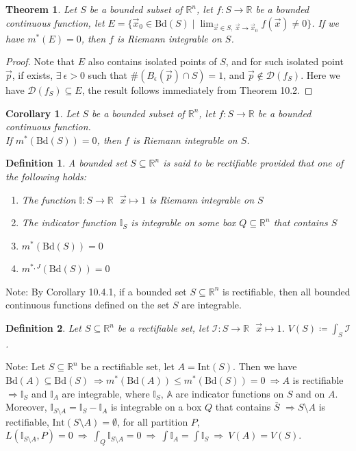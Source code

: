 \documentclass[15pt]{book}
\theoremstyle{break}
\theoremstyle{break}
\newtheorem{thm}{Theorem}[section]
\newtheorem{corT}[lem]{Corollary}
\newtheorem{defn}{Definition}[corL]
\newcommand{\R}{\mathbb{R}}
\newcommand{\D}{\mathcal{D}}
\newcommand{\Int}{\text{Int}}
\newcommand{\Bd}{\text{Bd}}
\newcommand{\note}{\color{red}Note: \color{black}}
\begin{document}
\begin{thm}
Let $S$ be a bounded subset of $\R^n$, let $f:S \to \R$ be a bounded continuous function, let $E = \{ \vec{x}_0 \in \Bd(S) \mid\lim_{\vec{x}\in S,\ \vec{x}\to \vec{x}_0} f(\vec{x}) \neq 0 \}$. If we have $m^*(E) = 0$, then $f$ is Riemann integrable on $S$. 
\end{thm}
\begin{proof}
Note that $E$ also contains isolated points of $S$, and for such isolated point $\vec{p}$, if exists, $\exists\ \epsilon >0$ such that $\#(B_\epsilon(\vec{p}) \cap S) = 1$, and $\vec{p}\notin \D(f_S)$. Here we have $\D(f_S) \subseteq E$, the result follows immediately from Theorem 10.2. 
\end{proof}

\begin{corT}
Let $S$ be a bounded subset of $\R^n$, let $f:S \to \R$ be a bounded continuous function.\\ 
If $m^*(\Bd(S)) = 0$, then $f$ is Riemann integrable on $S$. 
\end{corT}

\begin{defn}
A bounded set $S \subseteq \R^n$ is said to be rectifiable provided that one of the following holds:
\begin{enumerate}[topsep=3pt,itemsep=-1ex,partopsep=1ex,parsep=1ex]
\item The function $\mathbb{I}:S \to \R \ \ \ \vec{x}\mapsto 1$ is Riemann integrable on $S$
\item The indicator function $\mathbb{I}_S$ is integrable on some box $Q\subseteq \R^n$ that contains $S$
\item $m^*(\Bd(S)) = 0$
\item $m^{*,J}(\Bd(S)) = 0$
\end{enumerate} 
\end{defn}
\note By Corollary 10.4.1, if a bounded set $S\subseteq \R^n$ is rectifiable, then all bounded continuous functions defined on the set $S$ are integrable.

\begin{defn}
Let $S\subseteq \R^n$ be a rectifiable set, let $\mathcal{I}:S \to \R \ \ \ \vec{x}\mapsto 1$. $V(S) \coloneqq \int_{S} \mathcal{I}$.
\end{defn}


\note Let $S\subseteq \R^n$ be a rectifiable set, let $A = \Int(S)$. Then we have $\Bd(A) \subseteq \Bd(S) \ \Rightarrow  m^*(\Bd(A)) \leq m^*(\Bd(S)) = 0\ \Rightarrow A$ is rectifiable $\Rightarrow \mathbb{I}_S$ and $\mathbb{I}_A$ are integrable, where $\mathbb{I}_S,\,\mathbb{A}$ are indicator functions on $S$ and on $A$. Moreover, $\mathbb{I}_{S\setminus A}= \mathbb{I}_S - \mathbb{I}_A$ is integrable on a box $Q$ that contains $\bar{S}$ $\Rightarrow S\setminus A$ is rectifiable, $\Int(S\setminus A) = \emptyset$, for all partition $P$, $L(\mathbb{I}_{S\setminus A}, P) = 0 \ \Rightarrow\ \int_Q \mathbb{I}_{S\setminus A} = 0\ \Rightarrow \ \int \mathbb{I}_A = \int \mathbb{I}_S\  \Rightarrow \ V(A) = V(S)$. \\
\end{document}
